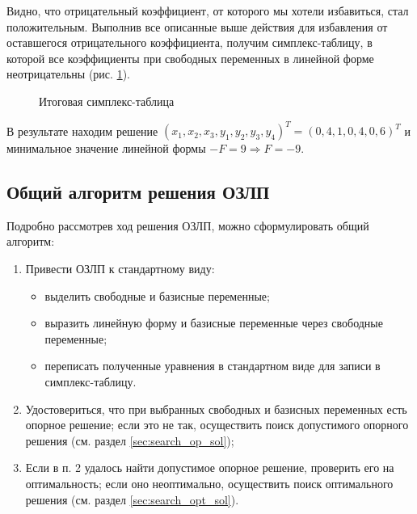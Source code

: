 \documentclass[a4paper,12pt]{report}
\begin{document}
Видно, что отрицательный коэффициент, от которого мы хотели избавиться, стал положительным. Выполнив все описанные выше действия для избавления от оставшегося отрицательного коэффициента, получим симплекс-таблицу, в которой все коэффициенты при свободных переменных в линейной форме неотрицательны (рис. \ref{fig:lp_find_optsol_6}).

\newpage

\begin{figure}[ht]
\caption{Итоговая симплекс-таблица}
\label{fig:lp_find_optsol_6}
\end{figure}

В результате находим решение $(x_{1}, x_{2}, x_{3}, y_{1}, y_{2}, y_{3}, y_{4})^{T} = (0, 4, 1, 0, 4, 0, 6)^{T}$ и минимальное значение линейной формы $-F = 9 \Rightarrow F = -9$.

\subsection{Общий алгоритм решения ОЗЛП}
Подробно рассмотрев ход решения ОЗЛП, можно сформулировать общий алгоритм:
\begin{enumerate}
\item Привести ОЗЛП к стандартному виду:
\begin{itemize}
\item выделить свободные и базисные переменные;
\item выразить линейную форму и базисные переменные через свободные переменные;
\item переписать полученные уравнения в стандартном виде для записи в симплекс-таблицу.
\end{itemize}
\item Удостовериться, что при выбранных свободных и базисных переменных есть опорное решение; если это не так, осуществить поиск допустимого опорного решения (см. раздел \ref{sec:search_op_sol});
\item Если в п. 2 удалось найти допустимое опорное решение, проверить его на оптимальность; если оно неоптимально, осуществить поиск оптимального решения (см. раздел \ref{sec:search_opt_sol}).
\end{enumerate}
\end{document}
